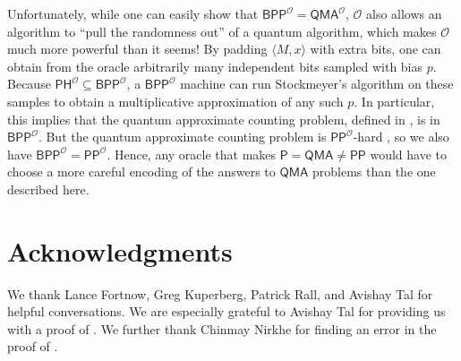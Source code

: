\documentclass[10pt,a4paper]{article}
\begin{document}
Unfortunately, while one can easily show that $\mathsf{BPP}^\mathcal{O} = \mathsf{QMA}^\mathcal{O}$, $\mathcal{O}$ also allows an algorithm to ``pull the randomness out'' of a quantum algorithm, which makes $\mathcal{O}$ much more powerful than it seems! By padding $\langle M, x \rangle$ with extra bits, one can obtain from the oracle arbitrarily many independent bits sampled with bias $p$. Because $\mathsf{PH}^\mathcal{O} \subseteq \mathsf{BPP}^\mathcal{O}$, a $\mathsf{BPP}^\mathcal{O}$ machine can run Stockmeyer's algorithm \cite{Sto83} on these samples to obtain a multiplicative approximation of any such $p$. In particular, this implies that the quantum approximate counting problem, defined in , is in $\mathsf{BPP}^\mathcal{O}$. But the quantum approximate counting problem is $\mathsf{PP}^\mathcal{O}$-hard \cite{Kup15}, so we also have $\mathsf{BPP}^\mathcal{O} = \mathsf{PP}^\mathcal{O}$. Hence, any oracle that makes $\mathsf{P} = \mathsf{QMA} \neq \mathsf{PP}$ would have to choose a more careful encoding of the answers to $\mathsf{QMA}$ problems than the one described here.

\section{Acknowledgments}

We thank Lance Fortnow, Greg Kuperberg, Patrick Rall, and Avishay Tal for helpful conversations. We are especially grateful to Avishay Tal for providing us with a proof of . We further thank Chinmay Nirkhe for finding an error in the proof of .
\end{document}
